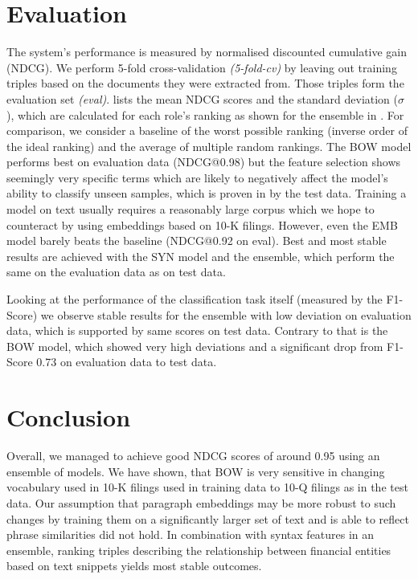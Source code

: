 \section{Evaluation}
The system's performance is measured by normalised discounted cumulative gain (NDCG)\cite{ir}.
We perform 5-fold cross-validation \emph{(5-fold-cv)} by leaving out training triples based on the documents they were extracted from. Those triples form the evaluation set \emph{(eval)}.
 lists the mean NDCG scores and the standard deviation ($\sigma$), which are calculated for each role's ranking as shown for the ensemble in .
For comparison, we consider a baseline of the worst possible ranking (inverse order of the ideal ranking) and the average of multiple random rankings.
\newpage
The BOW model performs best on evaluation data (NDCG@0.98) but the feature selection shows seemingly very specific terms which are likely to negatively affect the model's ability to classify unseen samples, which is proven in by the test data.
Training a model on text usually requires a reasonably large corpus which we hope to counteract by using embeddings based on 10-K filings.
However, even the EMB model barely beats the baseline (NDCG@0.92 on eval).
Best and most stable results are achieved with the SYN model and the ensemble, which perform the same on the evaluation data as on test data.

Looking at the performance of the classification task itself (measured by the F1-Score) we observe stable results for the ensemble with low deviation on evaluation data, which is supported by same scores on test data.
Contrary to that is the BOW model, which showed very high deviations and a significant drop from F1-Score 0.73 on evaluation data to test data.

\section{Conclusion}
Overall, we managed to achieve good NDCG scores of around 0.95 using an ensemble of models.
We have shown, that BOW is very sensitive in changing vocabulary used in 10-K filings used in training data to 10-Q filings as in the test data.
Our assumption that paragraph embeddings may be more robust to such changes by training them on a significantly larger set of text and is able to reflect phrase similarities did not hold.
In combination with syntax features in an ensemble, ranking triples describing the relationship between financial entities based on text snippets yields most stable outcomes.

